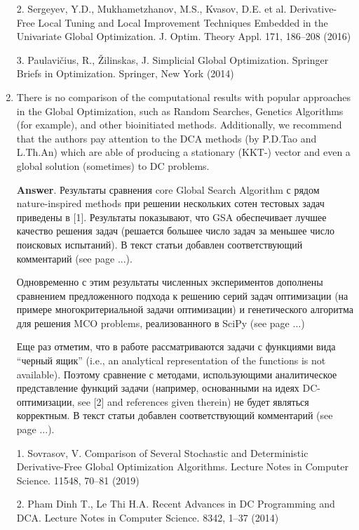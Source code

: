\documentclass{article}%
\begin{document}
\begin{enumerate}
2. Sergeyev, Y.D., Mukhametzhanov, M.S., Kvasov, D.E. et al. Derivative-Free Local Tuning and Local Improvement Techniques Embedded in the Univariate Global Optimization. J. Optim. Theory Appl. 171, 186--208 (2016)

3. Paulavi{\v c}ius, R., {\v Z}ilinskas, J. Simplicial Global Optimization. Springer Briefs in Optimization. Springer, New York (2014)


\item There is no comparison of the computational results with popular approaches in the Global Optimization, such as Random Searches, Genetics Algorithms (for example), and other bioinitiated methods.
Additionally, we recommend that the authors pay attention to the DCA methods (by P.D.Tao and L.Th.An) which are able of producing a stationary (KKT-) vector and even a global solution (sometimes) to DC problems.

\textbf{Answer}.
Результаты сравнения core Global Search Algorithm с рядом nature-inspired methods при решении нескольких сотен тестовых задач приведены в [1]. Результаты показывают, что GSA обеспечивает лучшее качество решения задач (решается большее число задач за меньшее число поисковых испытаний). В текст статьи добавлен соответствующий комментарий (see page ...).

Одновременно с этим результаты численных экспериментов дополнены сравнением предложенного подхода к решению серий задач оптимизации (на примере многокритериальной задачи оптимизации) и генетического алгоритма для решения MCO problems, реализованного в SciPy (see page ...)

Еще раз отметим, что в работе рассматриваются задачи с функциями вида ``черный ящик'' (i.e., an analytical representation of the functions is not available). Поэтому сравнение с методами, использующими аналитическое представление функций задачи (например, основанными на идеях DC-оптимизации, see [2] and references given therein) не будет являться корректным. В текст статьи добавлен соответствующий комментарий (see page ...).

1. Sovrasov, V.  Comparison of Several Stochastic and Deterministic Derivative-Free Global Optimization Algorithms.  Lecture Notes in Computer Science. 11548, 70--81 (2019)

2. Pham Dinh T., Le Thi H.A. Recent Advances in DC Programming and DCA. Lecture Notes in Computer Science. 8342, 1--37 (2014)



\end{enumerate}
\end{document}

